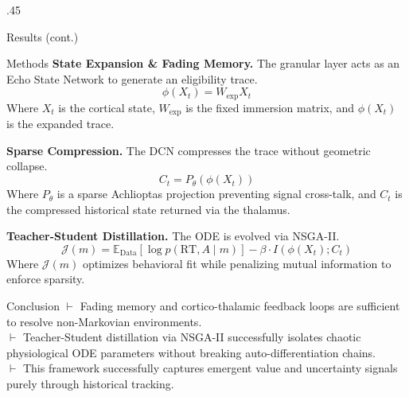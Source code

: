 \documentclass[final]{beamer}
\begin{document}
\begin{frame}[fragile,t]
\begin{columns}[T]
    \begin{column}{.45\textwidth}

      \begin{block}{Results (cont.)}
        \vspace{0.5cm}

        
        \vspace{0.8cm}

      \end{block}

      \begin{block}{Methods}
        \textbf{State Expansion \& Fading Memory.} The granular layer acts as an Echo State Network to generate an eligibility trace.
        \begin{equation}
          \phi(X_t) = W_{\text{exp}} X_t
        \end{equation}
        Where $X_t$ is the cortical state, $W_{\text{exp}}$ is the fixed immersion matrix, and $\phi(X_t)$ is the expanded trace.
        
        \vspace{0.5em}
        \textbf{Sparse Compression.} The DCN compresses the trace without geometric collapse.
        \begin{equation}
          C_t = P_\theta(\phi(X_t))
        \end{equation}
        Where $P_\theta$ is a sparse Achlioptas projection preventing signal cross-talk, and $C_t$ is the compressed historical state returned via the thalamus.

        \vspace{0.5em}
        \textbf{Teacher-Student Distillation.} The ODE is evolved via NSGA-II.
        \begin{equation}
          \mathcal{J}(m) = \mathbb{E}_{\text{Data}} [\log p(\text{RT}, A \mid m)] - \beta \cdot I(\phi(X_t); C_t)
        \end{equation}
        Where $\mathcal{J}(m)$ optimizes behavioral fit while penalizing mutual information to enforce sparsity.
      \end{block}

      \begin{block}{Conclusion}
        $\vdash$ Fading memory and cortico-thalamic feedback loops are sufficient to resolve non-Markovian environments. \\
        \vspace{0.2em}
        $\vdash$ Teacher-Student distillation via NSGA-II successfully isolates chaotic physiological ODE parameters without breaking auto-differentiation chains. \\
        \vspace{0.2em}
        $\vdash$ This framework successfully captures emergent value and uncertainty signals purely through historical tracking.
      \end{block}
      

\end{column}
\end{columns}
\end{frame}
\end{document}
